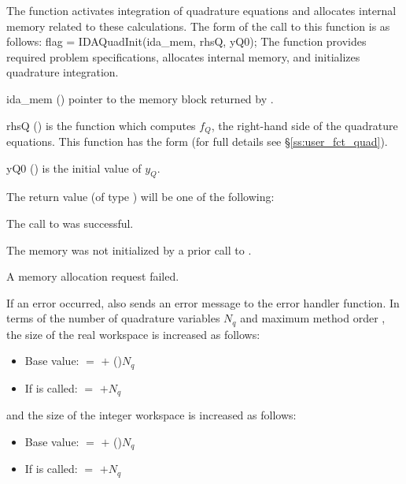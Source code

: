 {The function  activates integration of quadrature equations 
and allocates internal memory related to these calculations.
The form of the call to this function is as follows:
{
flag = IDAQuadInit(ida\_mem, rhsQ, yQ0);
}
{
  The function  provides required problem specifications,
  allocates internal memory, and initializes quadrature integration.
}
{
  \begin{args}
  \item[ida\_mem] ()
    pointer to the {\idas} memory block returned by .
  \item[rhsQ] ()
    is the {\CC} function which computes $f_Q$, the right-hand side of the quadrature
    equations. This function has the form 
     (for full details see \S\ref{ss:user_fct_quad}).
  \item[yQ0] ()
    is the initial value of $y_Q$.
  \end{args}
}
{
  The return value  (of type ) will be one of the following:
  \begin{args}
  \item[\Id{IDA\_SUCCESS}]
    The call to  was successful.
  \item[\Id{IDA\_MEM\_NULL}] 
    The {\idas} memory was not initialized by a prior call to .
  \item[\Id{IDA\_MEM\_FAIL}] 
    A memory allocation request failed.
  \end{args}
}
{
  If an error occurred,  also sends an error message to the
  error handler function.
}
In terms of the number of quadrature variables $N_q$ and maximum
method order , the size of the real workspace is increased
as follows:
\begin{itemize}
\item Base value:  $=$  $+$ ()$N_q$
\item If  is called:  $=$  $+ N_q$ 
\end{itemize}
and the size of the integer workspace is increased as follows:
\begin{itemize}
\item Base value:  $=$  $+$ ()$N_q$
\item If  is called:  $=$  $+ N_q$ 
\end{itemize}

}
